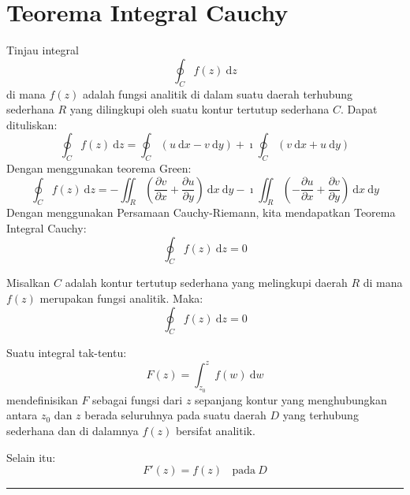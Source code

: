\section{Teorema Integral Cauchy}


Tinjau integral
\begin{equation*}
\oint_{C}f(z)\ \mathrm{d}z
\end{equation*}
di mana $f(z)$ adalah fungsi analitik di dalam suatu daerah terhubung
sederhana $R$ yang dilingkupi oleh suatu kontur tertutup sederhana
$C$. Dapat dituliskan:
\begin{equation*}
\oint_{C}f(z)\ \mathrm{d}z =
\oint_{C} \left( u\ \mathrm{d}x-v\ \mathrm{d}y \right) +
\imath \oint_{C} \left( v\ \mathrm{d}x + u\ \mathrm{d}y \right)
\end{equation*}
Dengan menggunakan teorema Green:
\begin{equation*}
\oint_{C}f(z)\ \mathrm{d}z = -\iint_{R} \left(\frac{\partial v}{\partial x} +
\frac{\partial u}{\partial y}\right)\ \mathrm{d}x\ \mathrm{d}y -
\imath\iint_{R}\left(-\frac{\partial u}{\partial x} +
\frac{\partial v}{\partial y}\right)\ \mathrm{d}x\ \mathrm{d}y
\end{equation*}
Dengan menggunakan Persamaan Cauchy-Riemann, kita mendapatkan Teorema
Integral Cauchy:
\begin{equation*}
\oint_{C} f(z)\ \mathrm{d}z = 0
\end{equation*}

\begin{theorem}
Misalkan $C$ adalah kontur tertutup sederhana yang melingkupi daerah
$R$ di mana $f(z)$ merupakan fungsi analitik. Maka:
\begin{equation*}
\oint_{C}f(z)\ \mathrm{d}z = 0
\end{equation*}
\end{theorem}

Suatu integral tak-tentu:
\begin{equation*}
F(z)=\int_{z_{0}}^{z}f(w)\ \mathrm{d}w
\end{equation*}
mendefinisikan $F$ sebagai fungsi dari $z$ sepanjang kontur yang
menghubungkan antara $z_{0}$ dan $z$ berada seluruhnya pada suatu
daerah $D$ yang terhubung sederhana dan di dalamnya $f(z)$ bersifat
analitik.

Selain itu:
\begin{equation*}
F'(z)=f(z)\ \ \ \ \text{pada}\ D
\end{equation*}

\rule[0.5ex]{1\columnwidth}{1pt}

